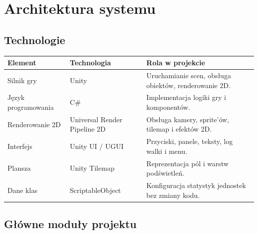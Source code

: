 \documentclass[12pt,a4paper]{article}
\begin{document}
\newpage

\section{Architektura systemu}

\subsection{Technologie}

\begin{longtable}{p{4cm} p{4cm} p{6cm}}
\toprule
\textbf{Element} & \textbf{Technologia} & \textbf{Rola w projekcie} \\
\midrule
\endhead
Silnik gry & Unity & Uruchamianie scen, obsługa obiektów, renderowanie 2D. \\[4pt]
Język programowania & C\# & Implementacja logiki gry i komponentów. \\[4pt]
Renderowanie 2D & Universal Render Pipeline 2D & Obsługa kamery, sprite'ów, tilemap i efektów 2D. \\[4pt]
Interfejs & Unity UI / UGUI & Przyciski, panele, teksty, log walki i menu. \\[4pt]
Plansza & Unity Tilemap & Reprezentacja pól i warstw podświetleń. \\[4pt]
Dane klas & ScriptableObject & Konfiguracja statystyk jednostek bez zmiany kodu. \\
\bottomrule
\end{longtable}

\subsection{Główne moduły projektu}
\end{document}
